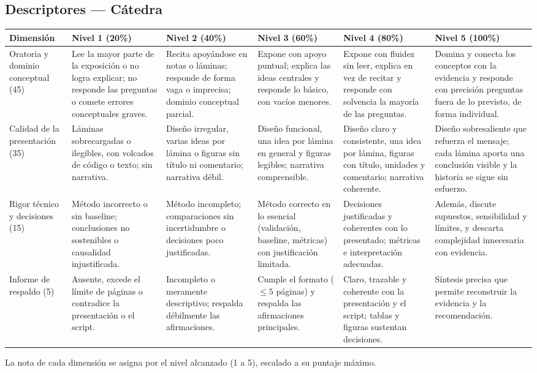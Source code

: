 \documentclass[11pt,letterpaper]{article}
\begin{document}
\begin{landscape}
\thispagestyle{plain}
\section*{Descriptores --- Cátedra}
\footnotesize\renewcommand{\arraystretch}{1.25}
\begin{tabular}{p{2.4cm} p{3.15cm} p{3.15cm} p{3.15cm} p{3.15cm} p{3.15cm}}
\toprule
Dimensión & Nivel 1 (20\%) & Nivel 2 (40\%) & Nivel 3 (60\%) & Nivel 4 (80\%) & Nivel 5 (100\%) \\
\midrule
Oratoria y dominio conceptual (45) & Lee la mayor parte de la exposición o no logra explicar; no responde las preguntas o comete errores conceptuales graves. & Recita apoyándose en notas o láminas; responde de forma vaga o imprecisa; dominio conceptual parcial. & Expone con apoyo puntual; explica las ideas centrales y responde lo básico, con vacíos menores. & Expone con fluidez sin leer, explica en vez de recitar y responde con solvencia la mayoría de las preguntas. & Domina y conecta los conceptos con la evidencia y responde con precisión preguntas fuera de lo previsto, de forma individual. \\
Calidad de la presentación (35) & Láminas sobrecargadas o ilegibles, con volcados de código o texto; sin narrativa. & Diseño irregular, varias ideas por lámina o figuras sin título ni comentario; narrativa débil. & Diseño funcional, una idea por lámina en general y figuras legibles; narrativa comprensible. & Diseño claro y consistente, una idea por lámina, figuras con título, unidades y comentario; narrativa coherente. & Diseño sobresaliente que refuerza el mensaje; cada lámina aporta una conclusión visible y la historia se sigue sin esfuerzo. \\
Rigor técnico y decisiones (15) & Método incorrecto o sin baseline; conclusiones no sostenibles o causalidad injustificada. & Método incompleto; comparaciones sin incertidumbre o decisiones poco justificadas. & Método correcto en lo esencial (validación, baseline, métricas) con justificación limitada. & Decisiones justificadas y coherentes con lo presentado; métricas e interpretación adecuadas. & Además, discute supuestos, sensibilidad y límites, y descarta complejidad innecesaria con evidencia. \\
Informe de respaldo (5) & Ausente, excede el límite de páginas o contradice la presentación o el script. & Incompleto o meramente descriptivo; respalda débilmente las afirmaciones. & Cumple el formato ($\leq 5$ páginas) y respalda las afirmaciones principales. & Claro, trazable y coherente con la presentación y el script; tablas y figuras sustentan decisiones. & Síntesis precisa que permite reconstruir la evidencia y la recomendación. \\
\bottomrule
\end{tabular}

\vspace{0.25cm}
\footnotesize La nota de cada dimensión se asigna por el nivel alcanzado (1 a 5), escalado a su puntaje máximo.
\end{landscape}
\end{document}
